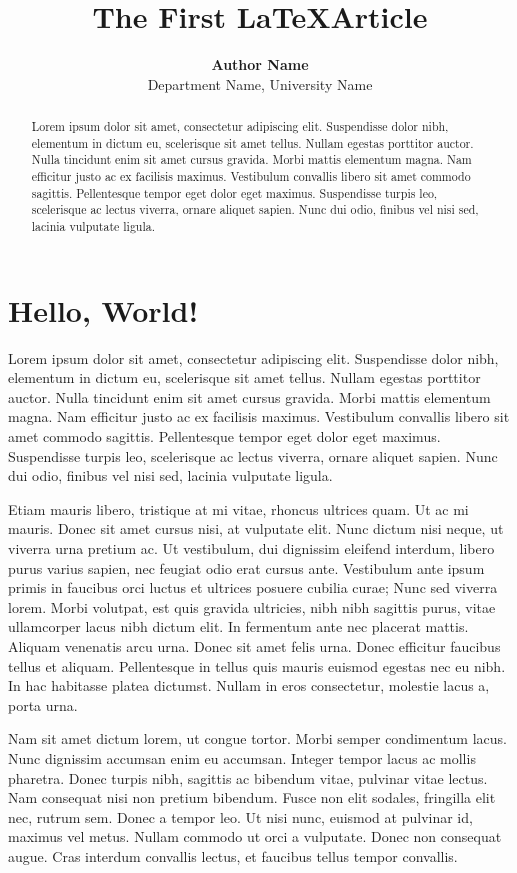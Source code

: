 \documentclass{article}
\title{\textbf{The First  \LaTeX  Article}}
\author{\textbf{Author Name} \\ Department Name, University Name}
\begin{document}
\maketitle

\begin{abstract}
    Lorem ipsum dolor sit amet, consectetur adipiscing elit. Suspendisse dolor nibh, elementum in dictum eu, scelerisque sit amet tellus. Nullam egestas porttitor auctor. Nulla tincidunt enim sit amet cursus gravida. Morbi mattis elementum magna. Nam efficitur justo ac ex facilisis maximus. Vestibulum convallis libero sit amet commodo sagittis. Pellentesque tempor eget dolor eget maximus. Suspendisse turpis leo, scelerisque ac lectus viverra, ornare aliquet sapien. Nunc dui odio, finibus vel nisi sed, lacinia vulputate ligula.
\end{abstract}

\section{Hello, World!}
Lorem ipsum dolor sit amet, consectetur adipiscing elit. Suspendisse dolor nibh, elementum in dictum eu, scelerisque sit amet tellus. Nullam egestas porttitor auctor. Nulla tincidunt enim sit amet cursus gravida. Morbi mattis elementum magna. Nam efficitur justo ac ex facilisis maximus. Vestibulum convallis libero sit amet commodo sagittis. Pellentesque tempor eget dolor eget maximus. Suspendisse turpis leo, scelerisque ac lectus viverra, ornare aliquet sapien. Nunc dui odio, finibus vel nisi sed, lacinia vulputate ligula.

Etiam mauris libero, tristique at mi vitae, rhoncus ultrices quam. Ut ac mi mauris. Donec sit amet cursus nisi, at vulputate elit. Nunc dictum nisi neque, ut viverra urna pretium ac. Ut vestibulum, dui dignissim eleifend interdum, libero purus varius sapien, nec feugiat odio erat cursus ante. Vestibulum ante ipsum primis in faucibus orci luctus et ultrices posuere cubilia curae; Nunc sed viverra lorem. Morbi volutpat, est quis gravida ultricies, nibh nibh sagittis purus, vitae ullamcorper lacus nibh dictum elit. In fermentum ante nec placerat mattis. Aliquam venenatis arcu urna. Donec sit amet felis urna. Donec efficitur faucibus tellus et aliquam. Pellentesque in tellus quis mauris euismod egestas nec eu nibh. In hac habitasse platea dictumst. Nullam in eros consectetur, molestie lacus a, porta urna.

Nam sit amet dictum lorem, ut congue tortor. Morbi semper condimentum lacus. Nunc dignissim accumsan enim eu accumsan. Integer tempor lacus ac mollis pharetra. Donec turpis nibh, sagittis ac bibendum vitae, pulvinar vitae lectus. Nam consequat nisi non pretium bibendum. Fusce non elit sodales, fringilla elit nec, rutrum sem. Donec a tempor leo. Ut nisi nunc, euismod at pulvinar id, maximus vel metus. Nullam commodo ut orci a vulputate. Donec non consequat augue. Cras interdum convallis lectus, et faucibus tellus tempor convallis.
\end{document}
